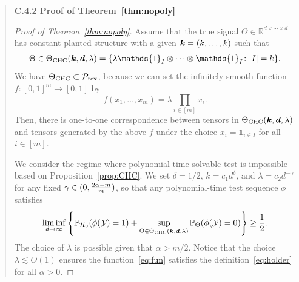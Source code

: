\documentclass[11pt]{article}
\theoremstyle{plain}
\theoremstyle{definition}
\begin{document}
\begin{enumerate}[wide, labelwidth=!, labelindent=0pt]
\begin{quote}
{\bf C.4.2 Proof of Theorem~\ref{thm:nopoly}}
 \begin{proof}[Proof of Theorem~\ref{thm:nopoly}]
 Assume that  the true signal $\Theta\in\mathbb{R}^{d\times \cdots \times d}$ has constant planted structure with a given $\bm{k}=(k,\ldots,k)$ such that 
\begin{align}
    \Theta \in\Theta_{\text{CHC}}(\mk,\md,\lambda) = \{ \lambda \mathds{1}_{I}\otimes \cdots\otimes \mathds{1}_{I}\colon  |I| = k\}.
\end{align}
We have $\Theta_{\text{CHC}}\subset \mathcal{P}_{\textup{rex}}$, because we can set the infinitely smooth function $f: [0,1]^m \to[0,1]$ by
\begin{equation}\label{eq:fun}
f(x_1,\ldots,x_m)=\lambda \prod_{i\in[m]}x_i.
\end{equation}
Then, there is one-to-one correspondence between tensors in $\Theta_{\textup{CHC}}(\bm{k},\bm{d},\lambda)$ and tensors generated by the above $f$ under the choice $x_i=\mathds{1}_{i\in I}$ for all $i\in[m]$.



We consider the regime where polynomial-time solvable test is impossible based on Proposition~\ref{prop:CHC}. We set $\delta=1/2$, $k = c_1d^{\delta}$, and $\lambda = c_2d^{-\gamma}$ for any fixed $\gamma \in (0, {2\alpha -m \over m})$, so that any polynomial-time test sequence $\phi$ satisfies 
\[
 \liminf_{d\rightarrow\infty} \left\{\mathbb{P}_{\mathcal{H}_0}(\phi(\mathcal{Y}) = 1)+\sup_{\Theta \in \Theta_{\textup{CHC}}(\bm{k},\bm{d},\lambda)}\mathbb{P}_{\Theta}(\phi(\mathcal{Y}) =0) \right\}\geq\frac{1}{2}.
\]
The choice of $\lambda$ is possible given that $\alpha > m/2$. Notice that the choice $\lambda \lesssim O(1)$ ensures the function~\eqref{eq:fun} satisfies the definition~\eqref{eq:holder} for all $\alpha>0$. 


\end{proof}
\end{quote}
\end{enumerate}
\end{document}
